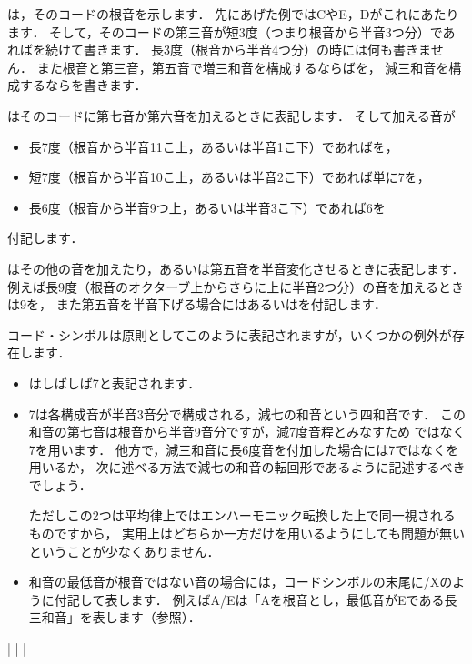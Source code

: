 \documentclass[dvipdfmx,uplatex,b5paper,openany,jbase=12Q,nomag*,textwidth-limit=44%
               ]{gachimuchi}[2020/05/05]
\begin{document}
\txCirc は，そのコードの根音を示します．
先にあげた例ではCやE\aFlat ，Dがこれにあたります．
そして，そのコードの第三音が短3度（つまり根音から半音3つ分）であれば\Min を続けて書きます．
長3度（根音から半音4つ分）の時には何も書きません．
また根音と第三音，第五音で増三和音を構成するならば\Aug を，
減三和音を構成するなら\Dimt を書きます．

\txSqr はそのコードに第七音か第六音を加えるときに表記します．
そして加える音が
\begin{itemize}
  \item 長7度（根音から半音11こ上，あるいは半音1こ下）であればを，
  \item 短7度（根音から半音10こ上，あるいは半音2こ下）であれば単に\subsc7を，
  \item 長6度（根音から半音9つ上，あるいは半音3こ下）であれば\subsc6を
\end{itemize}
付記します．

\txTri はその他の音を加えたり，あるいは第五音を半音変化させるときに表記します．
例えば長9度（根音のオクターブ上からさらに上に半音2つ分）の音を加えるときは\supsc9を，
また第五音を半音下げる場合にはあるいはを付記します．

コード・シンボルは原則としてこのように表記されますが，いくつかの例外が存在します．
\begin{itemize}
  \item \txCirc\Min{}はしばしば\txCirc\hDim\subsc7と表記されます．
  \item \txCirc\Dim\subsc7は各構成音が半音3音分で構成される，減七の和音という四和音です．
        この和音の第七音は根音から半音9音分ですが，減7度音程とみなすため
        \Min{}ではなく\Dim\subsc7を用います．
        他方で，減三和音に長6度音を付加した場合には\Dim\subsc7ではなく\Min{}を用いるか，
        次に述べる方法で減七の和音の転回形であるように記述するべきでしょう．
        
        ただしこの2つは平均律上ではエンハーモニック転換した上で同一視されるものですから，
        実用上はどちらか一方だけを用いるようにしても問題が無いということが少なくありません．
  \item 和音の最低音が根音ではない音の場合には，コードシンボルの末尾に/Xのように付記して表します．
        例えばA/Eは「Aを根音とし，最低音がEである長三和音」を表します（参照）．
\end{itemize}
\begin{Music}[0.6\linewidth]
  \Startpiece%
  \Notes%
  \zchordsu{}|%
  \en%
  \Notes%
  |%
  \en%
  \Notes%
  |%
  \en\setdoublebar%
  \endpiece%
\end{Music}
\end{document}
